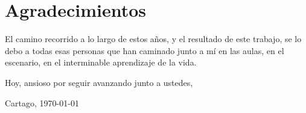 \chapter*{Agradecimientos}
\thispagestyle{empty}

El camino recorrido a lo largo de estos años, y el resultado de este trabajo, se lo debo a todas esas personas que han caminado junto a mí en las aulas, en el escenario, en el interminable aprendizaje de la vida.

Hoy, ansioso por seguir avanzando junto a ustedes,

\vspace*{1cm}

\scriptAuthor

Cartago, \today

\cleardoublepage


